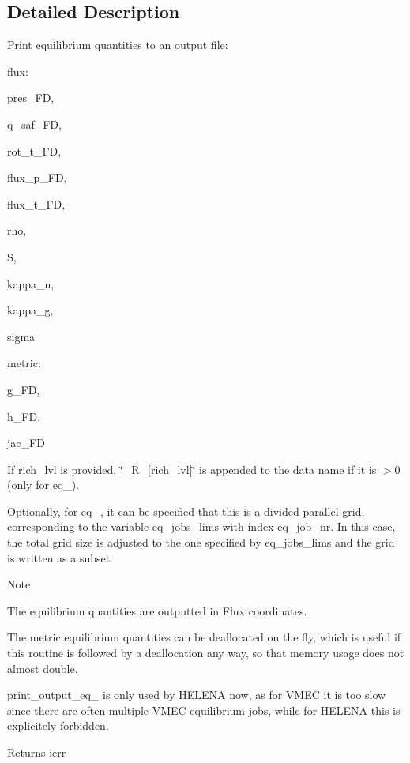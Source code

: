\subsection{Detailed Description}
Print equilibrium quantities to an output file\+: 


\begin{DoxyItemize}
\item flux\+:
\begin{DoxyItemize}
\item {\ttfamily pres\+\_\+\+FD},
\item {\ttfamily q\+\_\+saf\+\_\+\+FD},
\item {\ttfamily rot\+\_\+t\+\_\+\+FD},
\item {\ttfamily flux\+\_\+p\+\_\+\+FD},
\item {\ttfamily flux\+\_\+t\+\_\+\+FD},
\item {\ttfamily rho},
\item {\ttfamily S},
\item {\ttfamily kappa\+\_\+n},
\item {\ttfamily kappa\+\_\+g},
\item {\ttfamily sigma} 
\end{DoxyItemize}
\item metric\+:
\begin{DoxyItemize}
\item {\ttfamily g\+\_\+\+FD},
\item {\ttfamily h\+\_\+\+FD},
\item {\ttfamily jac\+\_\+\+FD} 
\end{DoxyItemize}
\end{DoxyItemize}

If {\ttfamily rich\+\_\+lvl} is provided, {\ttfamily \char`\"{}\+\_\+\+R\+\_\+\mbox{[}rich\+\_\+lvl\mbox{]}\char`\"{}} is appended to the data name if it is {\ttfamily $>$0} (only for {\ttfamily eq\+\_}).

Optionally, for {\ttfamily eq\+\_}, it can be specified that this is a divided parallel grid, corresponding to the variable {\ttfamily eq\+\_\+jobs\+\_\+lims} with index {\ttfamily eq\+\_\+job\+\_\+nr}. In this case, the total grid size is adjusted to the one specified by {\ttfamily eq\+\_\+jobs\+\_\+lims} and the grid is written as a subset. \begin{DoxyNote}{Note}

\begin{DoxyEnumerate}
\item The equilibrium quantities are outputted in Flux coordinates.
\item The metric equilibrium quantities can be deallocated on the fly, which is useful if this routine is followed by a deallocation any way, so that memory usage does not almost double.
\item {\ttfamily print\+\_\+output\+\_\+eq\+\_} is only used by H\+E\+L\+E\+NA now, as for V\+M\+EC it is too slow since there are often multiple V\+M\+EC equilibrium jobs, while for H\+E\+L\+E\+NA this is explicitely forbidden.
\end{DoxyEnumerate}
\end{DoxyNote}
\begin{DoxyReturn}{Returns}
ierr 
\end{DoxyReturn}


